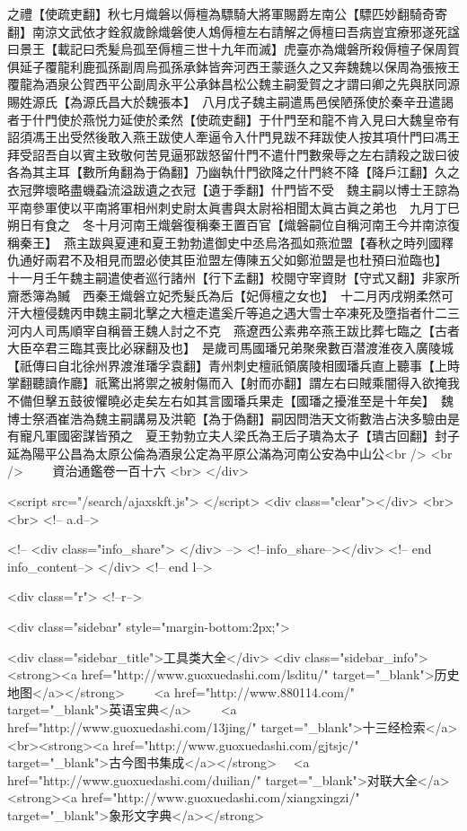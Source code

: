 之禮【使疏吏翻】秋七月熾磐以傉檀為驃騎大將軍賜爵左南公【驃匹妙翻騎奇寄翻】南涼文武依才銓叙歲餘熾磐使人鴆傉檀左右請解之傉檀曰吾病豈宜療邪遂死諡曰景王【載記曰秃髪烏孤至傉檀三世十九年而滅】虎臺亦為熾磐所殺傉檀子保周賀俱延子覆龍利鹿孤孫副周烏孤孫承鉢皆奔河西王蒙遜久之又奔魏魏以保周為張掖王覆龍為酒泉公賀西平公副周永平公承鉢昌松公魏主嗣愛賀之才謂曰卿之先與朕同源賜姓源氏【為源氏昌大於魏張本】　八月戊子魏主嗣遣馬邑侯陋孫使於秦辛丑遣謁者于什門使於燕悦力延使於柔然【使疏吏翻】于什門至和龍不肯入見曰大魏皇帝有詔須馮王出受然後敢入燕王跋使人牽逼令入什門見跋不拜跋使人按其項什門曰馮王拜受詔吾自以賓主致敬何苦見逼邪跋怒留什門不遣什門數衆辱之左右請殺之跋曰彼各為其主耳【數所角翻為于偽翻】乃幽執什門欲降之什門終不降【降戶江翻】久之衣冠弊壞略盡蟣蝨流溢跋遺之衣冠【遺于季翻】什門皆不受　魏主嗣以博士王諒為平南參軍使以平南將軍相州刺史尉太眞書與太尉裕相聞太眞古眞之弟也　九月丁巳朔日有食之　冬十月河南王熾磐復稱秦王置百官【熾磐嗣位自稱河南王今并南涼復稱秦王】　燕主跋與夏連和夏王勃勃遣御史中丞烏洛孤如燕涖盟【春秋之時列國釋仇通好兩君不及相見而盟必使其臣涖盟左傳陳五父如鄭涖盟是也杜預曰涖臨也】　十一月壬午魏主嗣遣使者巡行諸州【行下孟翻】校閱守宰資財【守式又翻】非家所齎悉簿為贓　西秦王熾磐立妃禿髮氏為后【妃傉檀之女也】　十二月丙戌朔柔然可汗大檀侵魏丙申魏主嗣北擊之大檀走遣奚斤等追之遇大雪士卒凍死及墮指者什二三　河内人司馬順宰自稱晉王魏人討之不克　燕遼西公素弗卒燕王跋比葬七臨之【古者大臣卒君三臨其喪比必寐翻及也】　是歲司馬國璠兄弟聚衆數百潜渡淮夜入廣陵城【祇傳曰自北徐州界渡淮璠孚袁翻】青州刺史檀祇領廣陵相國璠兵直上聽事【上時掌翻聽讀作廳】祇驚出將禦之被射傷而入【射而亦翻】謂左右曰賊乘闇得入欲掩我不備但擊五鼓彼懼曉必走矣左右如其言國璠兵果走【國璠之擾淮至是十年矣】　魏博士祭酒崔浩為魏主嗣講易及洪範【為于偽翻】嗣因問浩天文術數浩占決多驗由是有寵凡軍國密謀皆預之　夏王勃勃立夫人梁氏為王后子璝為太子【璝古回翻】封子延為陽平公昌為太原公倫為酒泉公定為平原公滿為河南公安為中山公<br />
<br />
　　資治通鑑卷一百十六  <br>
   </div> 

<script src="/search/ajaxskft.js"> </script>
 <div class="clear"></div>
<br>
<br>
 <!-- a.d-->

 <!--
<div class="info_share">
</div> 
-->
 <!--info_share--></div>   <!-- end info_content-->
  </div> <!-- end l-->

<div class="r">   <!--r-->



<div class="sidebar"  style="margin-bottom:2px;">

 
<div class="sidebar_title">工具类大全</div>
<div class="sidebar_info">
<strong><a href="http://www.guoxuedashi.com/lsditu/" target="_blank">历史地图</a></strong>　　
<a href="http://www.880114.com/" target="_blank">英语宝典</a>　　
<a href="http://www.guoxuedashi.com/13jing/" target="_blank">十三经检索</a>　
<br><strong><a href="http://www.guoxuedashi.com/gjtsjc/" target="_blank">古今图书集成</a></strong>　
<a href="http://www.guoxuedashi.com/duilian/" target="_blank">对联大全</a>　<strong><a href="http://www.guoxuedashi.com/xiangxingzi/" target="_blank">象形文字典</a></strong>　

